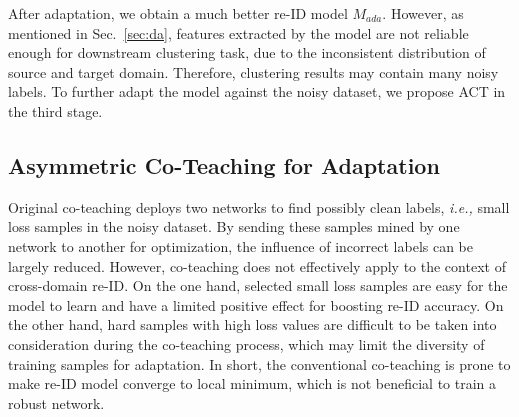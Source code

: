 \documentclass[letterpaper]{article} \usepackage{aaai20}  \usepackage{times}  \usepackage{helvet} \usepackage{courier}  \usepackage[hyphens]{url}  \usepackage{graphicx} \urlstyle{rm} \def\UrlFont{\rm}  \usepackage{graphicx}  \frenchspacing  \setlength{\pdfpagewidth}{8.5in}  \setlength{\pdfpageheight}{11in}  \usepackage{color}
\begin{document}
After adaptation, we obtain a much better re-ID model $M_{ada}$. However, as mentioned in Sec.~\ref{sec:da}, features extracted by the model are not reliable enough for downstream clustering task, due to the inconsistent distribution of source and target domain. Therefore, clustering results may contain many noisy labels. To further adapt the model against the noisy dataset, we propose ACT in the third stage.


\subsection{Asymmetric Co-Teaching for Adaptation} 
\label{sec:ACT}
Original co-teaching \cite{han2018co} deploys two networks to find possibly clean labels, \textit{i.e.,} small loss samples in the noisy dataset. By sending these samples mined by one network to another for optimization, the influence of incorrect labels can be largely reduced. 
However, co-teaching does not effectively apply to the context of cross-domain re-ID. On the one hand, selected small loss samples are easy for the model to learn and have a limited positive effect for boosting re-ID accuracy. On the other hand, hard samples with high loss values are difficult to be taken into consideration during the co-teaching process, which may limit the diversity of training samples for adaptation. In short, the conventional co-teaching is prone to make re-ID model converge to local minimum, which is not beneficial to train a robust network.
\end{document}

